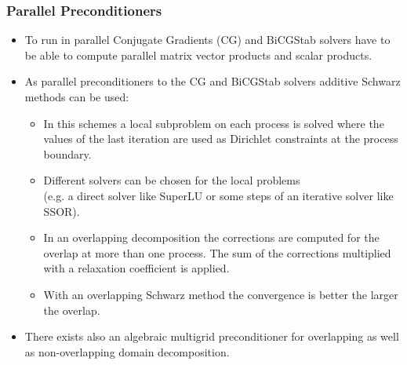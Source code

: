 \begin{frame}
\frametitle{Parallel Preconditioners}
\begin{itemize}
\item To run in parallel Conjugate Gradients (CG) and BiCGStab solvers have to be able to compute parallel matrix vector
products and scalar products.
\item As parallel preconditioners to the CG and BiCGStab solvers additive Schwarz methods can be used:
\begin{itemize}
\item In this schemes a local subproblem on each process is solved
where the values of the last iteration are used as Dirichlet constraints at the process boundary.
\item Different solvers can be chosen for the local problems\\ (e.g. a direct solver like SuperLU or some steps of an
iterative solver like SSOR).
\item In an overlapping decomposition the corrections are computed for the overlap at more than one process. The sum of the corrections multiplied with a relaxation
coefficient is applied.
\item With an overlapping Schwarz method the convergence is better the larger the overlap.
\end{itemize}
\item There exists also an algebraic multigrid preconditioner for overlapping as well as non-overlapping domain decomposition.
\end{itemize}
\end{frame}


